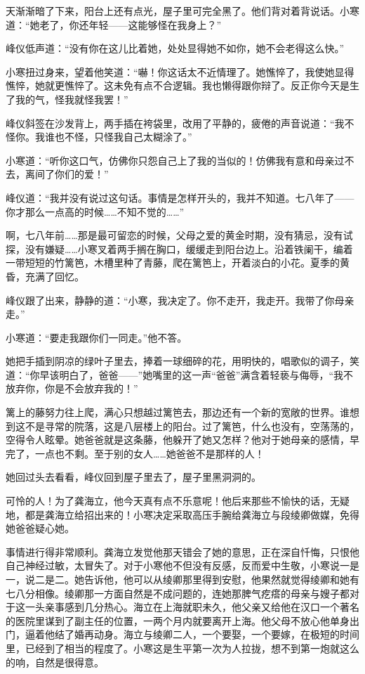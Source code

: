\par 天渐渐暗了下来，阳台上还有点光，屋子里可完全黑了。他们背对着背说话。小寒道：“她老了，你还年轻——这能够怪在我身上？”
\par 峰仪低声道：“没有你在这儿比着她，处处显得她不如你，她不会老得这么快。”
\par 小寒扭过身来，望着他笑道：“嚇！你这话太不近情理了。她憔悴了，我使她显得憔悴，她就更憔悴了。这未免有点不合逻辑。我也懒得跟你辩了。反正你今天是生了我的气，怪我就怪我罢！”
\par 峰仪斜签在沙发背上，两手插在袴袋里，改用了平静的，疲倦的声音说道：“我不怪你。我谁也不怪，只怪我自己太糊涂了。”
\par 小寒道：“听你这口气，仿佛你只怨自己上了我的当似的！仿佛我有意和母亲过不去，离间了你们的爱！”
\par 峰仪道：“我并没有说过这句话。事情是怎样开头的，我并不知道。七八年了——你才那么一点高的时候……不知不觉的……”
\par 啊，七八年前……那是最可留恋的时候，父母之爱的黄金时期，没有猜忌，没有试探，没有嫌疑……小寒叉着两手搁在胸口，缓缓走到阳台边上。沿着铁阑干，编着一带短短的竹篱笆，木槽里种了青藤，爬在篱笆上，开着淡白的小花。夏季的黄昏，充满了回忆。
\par 峰仪跟了出来，静静的道：“小寒，我决定了。你不走开，我走开。我带了你母亲走。”
\par 小寒道：“要走我跟你们一同走。”他不答。
\par 她把手插到阴凉的绿叶子里去，捧着一球细碎的花，用明快的，唱歌似的调子，笑道：“你早该明白了，爸爸——”她嘴里的这一声“爸爸”满含着轻亵与侮辱，“我不放弃你，你是不会放弃我的！”
\par 篱上的藤努力往上爬，满心只想越过篱笆去，那边还有一个新的宽敞的世界。谁想到这不是寻常的院落，这是八层楼上的阳台。过了篱笆，什么也没有，空荡荡的，空得令人眩晕。她爸爸就是这条藤，他躲开了她又怎样？他对于她母亲的感情，早完了，一点也不剩。至于别的女人……她爸爸不是那样的人！
\par 她回过头去看看，峰仪回到屋子里去了，屋子里黑洞洞的。
\par 可怜的人！为了龚海立，他今天真有点不乐意呢！他后来那些不愉快的话，无疑地，都是龚海立给招出来的！小寒决定采取高压手腕给龚海立与段绫卿做媒，免得她爸爸疑心她。
\par 事情进行得非常顺利。龚海立发觉他那天错会了她的意思，正在深自忏悔，只恨他自己神经过敏，太冒失了。对于小寒他不但没有反感，反而爱中生敬，小寒说一是一，说二是二。她告诉他，他可以从绫卿那里得到安慰，他果然就觉得绫卿和她有七八分相像。绫卿那一方面自然是不成问题的，连她那脾气疙瘩的母亲与嫂子都对于这一头亲事感到几分热心。海立在上海就职未久，他父亲又给他在汉口一个著名的医院里谋到了副主任的位置，一两个月内就要离开上海。他父母不放心他单身出门，逼着他结了婚再动身。海立与绫卿二人，一个要娶，一个要嫁，在极短的时间里，已经到了相当的程度了。小寒这是生平第一次为人拉拢，想不到第一炮就这么的响，自然是很得意。

